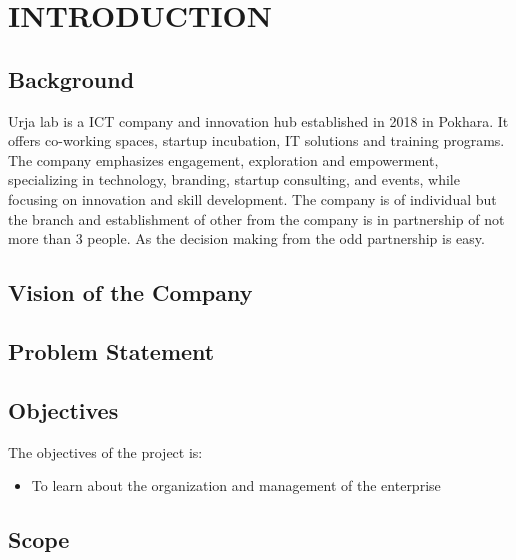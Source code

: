 \setcounter{page}{1}
\chapter{INTRODUCTION}
    \section{Background}
        Urja lab is a ICT company and innovation hub established in 2018 in Pokhara. It offers co-working spaces, startup incubation, IT solutions and training programs. The company emphasizes engagement, exploration and empowerment, specializing in technology, branding, startup consulting, and events, while focusing on innovation and skill development. The company is of individual but the branch and establishment of other from the company is in partnership of not more than 3 people. As the decision making from the odd partnership is easy.

    \section{Vision of the Company}
    
    
    \section{Problem Statement}
    
    
    
    \section{Objectives}
    The objectives of the project is:
        \begin{itemize}
        \setlength\itemsep{1.5pt}
        \item To learn about the organization and management of the enterprise

        \end{itemize}


    \section{Scope}
    
